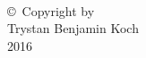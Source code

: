 
\thispagestyle{empty}
\hbox{\ }

\vfill
\renewcommand{\baselinestretch}{1}
\small\normalsize

\vspace{-.65in}

\begin{center}
\large{\copyright \hbox{ }Copyright by\\
Trystan Benjamin Koch  %
\\
2016}
\end{center}

\vfill

